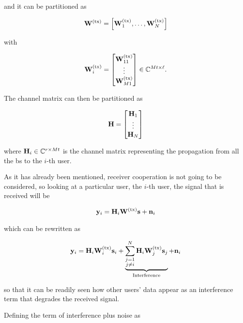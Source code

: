 \noindent
and it can be partitioned as

\begin{equation} \label{eq:precod_partition}
    \mathbf{W}^{(\text{tx})} = \left[ \mathbf{W}^{(\text{tx})}_1, \ldots, \mathbf{W}^{(\text{tx})}_N \right]
\end{equation}

\noindent
with

\begin{equation} \label{eq_precod_user}
    \mathbf{W}^{(\text{tx})}_i = \begin{bmatrix}
        \mathbf{W}^{(\text{tx})}_{11} \\
        \vdots \\
        \mathbf{W}^{(\text{tx})}_{M1}
    \end{bmatrix} \in \mathbb{C}^{Mt \times \ell}.
\end{equation}

The channel matrix can then be partitioned as

\begin{equation} \label{eq:ch_mat_partition}
    \mathbf{H} = \begin{bmatrix}
        \mathbf{H}_1 \\
        \vdots \\
        \mathbf{H}_N
    \end{bmatrix}
\end{equation}

\noindent
where $\mathbf{H}_i \in \mathbb{C}^{r \times Mt}$ is the channel matrix representing the
propagation from all the \gls{bs} to the $i$-th user.

As it has already been mentioned, receiver cooperation is not going to be
considered, so looking at a particular user, \eg the $i$-th user, the
signal that is received will be

\begin{equation} \label{eq:rx_signal_user}
    \mathbf{y}_i = \mathbf{H}_i \mathbf{W}^{(\text{tx})} \mathbf{s} + \mathbf{n}_i
\end{equation}

\noindent
which can be rewritten as

\begin{equation} \label{eq:rx_signal_user_interf}
    \mathbf{y}_i = \mathbf{H}_i \mathbf{W}^{(\text{tx})}_i \mathbf{s}_i +
    \underbrace{\sum\limits_{\substack{j = 1\\j \neq i}}^{N} \mathbf{H}_i
        \mathbf{W}^{(\text{tx})}_j \mathbf{s}_j}_{\text{Interference}} + \mathbf{n}_i
\end{equation}

\noindent
so that it can be readily seen how other users' data appear as an interference
term that degrades the received signal.

Defining the term of interference plus noise as

